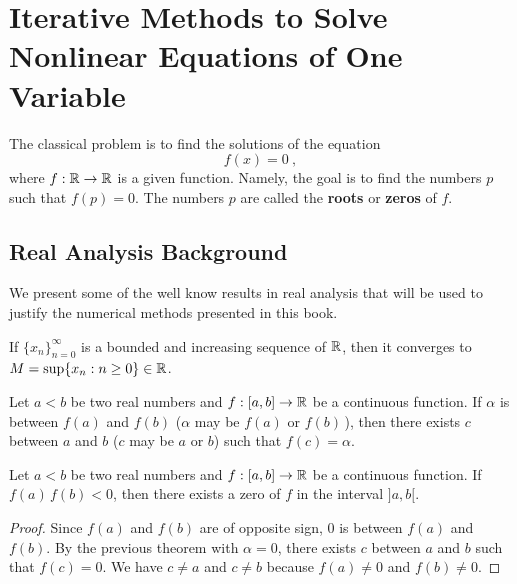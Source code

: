 \chapter{Iterative Methods to Solve Nonlinear Equations of One
Variable}\label{chaptSeqA}

The classical problem is to find the solutions of the equation
\begin{equation} \label{equ1}
f(x)  = 0 \ ,
\end{equation}
where $f:\mathbb{R} \rightarrow \mathbb{R}$ is a given function.  Namely, the goal
is to find the numbers $p$ such that $f(p) = 0$.  The numbers $p$ are called
the {\bfseries roots} or
{\bfseries zeros} of $f$.

\section{Real Analysis Background}

We present some of the well know results in real analysis that will be
used to justify the numerical methods presented in this book.

\begin{theorem}
If $\{x_n\}_{n=0}^\infty$ is a bounded and increasing
sequence of $\mathbb{R}$, then it converges to
$M = \sup \{x_n : n \geq 0 \} \in \mathbb{R}$.
\label{Th0}
\end{theorem}

\begin{theorem}
Let $a<b$ be two real numbers and $f:[a,b] \rightarrow \mathbb{R}$ be a
continuous function.  If $\alpha$ is between $f(a)$ and
$f(b)$ ($\alpha$ may be $f(a)$ or $f(b)$\,), then there exists $c$
between $a$ and $b$ ($c$ may be $a$ or $b$) such that $f(c)=\alpha$.
\label{Th1}
\end{theorem}

\begin{cor}
Let $a<b$ be two real numbers and $f:[a,b] \rightarrow \mathbb{R}$ be a
continuous function.  If $f(a)\,f(b)<0$, then there exists a zero of
$f$ in the interval $]a,b[$.
\label{Cor1}
\end{cor}

\begin{proof}
Since $f(a)$ and $f(b)$ are of opposite sign, $0$ is between $f(a)$
and $f(b)$.  By the previous theorem with $\alpha = 0$, there exists
$c$ between $a$ and $b$ such that $f(c) = 0$.  We have $c \neq a$ and
$c \neq b$ because $f(a) \neq 0$ and $f(b) \neq 0$.
\end{proof}

